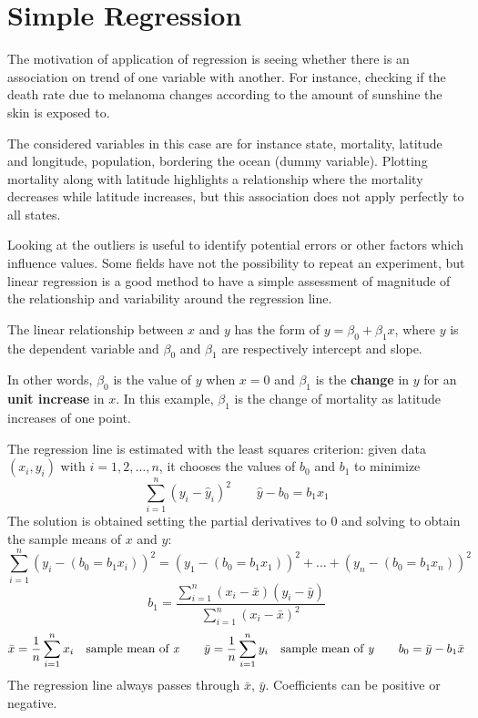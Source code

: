 \section{Simple Regression}
The motivation of application of regression is seeing whether there is an association on trend of one variable with another. For instance, checking if the death rate due to melanoma changes according to the amount of sunshine the skin is exposed to.

The considered variables in this case are for instance state, mortality, latitude and longitude, population, bordering the ocean (dummy variable). Plotting mortality along with latitude highlights a relationship where the mortality decreases while latitude increases, but this association does not apply perfectly to all states. 

Looking at the outliers is useful to identify potential errors or other factors which influence values. Some fields have not the possibility to repeat an experiment, but linear regression is a good method to have a simple assessment of magnitude of the relationship and variability around the regression line. 

The linear relationship between $x$ and $y$ has the form of $y = \beta_0 + \beta_1 x$, where $y$ is the dependent variable and $\beta_0$ and $\beta_1$ are respectively intercept and slope.

In other words, $\beta_0$ is the value of $y$ when $x = 0$ and $\beta_1$ is the \textbf{change} in $y$ for an \textbf{unit increase} in $x$. In this example, $\beta_1$ is the change of mortality as latitude increases of one point.

The regression line is estimated with the least squares criterion: given data $(x_i, y_i)$ with $i = 1, 2, \dots, n$, it chooses the values of $b_0$ and $b_1$ to minimize
$$\sum_{i=1}^{n}(y_i - \hat{y}_i)^2 \qquad \hat{y} - b_0 = b_1x_1$$
The solution is obtained setting the partial derivatives to 0 and solving to obtain the sample means of $x$ and $y$:
$$\sum_{i=1}^{n} (y_i - (b_0 = b_1 x_i))^2 = (y_1 - (b_0 = b_1x_1))^2 + \dots + (y_n - (b_0 = b_1 x_n))^2$$
$$b_1 = \frac{\sum_{i=1}^{n}(x_i - \bar{x})(y_i - \bar{y})}{\sum_{i=1}^{n}(x_i - \bar{x})^2}$$
$$\bar{x} = \frac{1}{n} \sum_{i=1}^{n}x_i \quad \text{sample mean of \textit{x}} \qquad \bar{y} = \frac{1}{n} \sum_{i=1}^{n}y_i \quad \text{sample mean of \textit{y}} \qquad b_0 = \bar{y} - b_1 \bar{x}$$
The regression line always passes through $\bar{x}$, $\bar{y}$. Coefficients can be positive or negative. 

